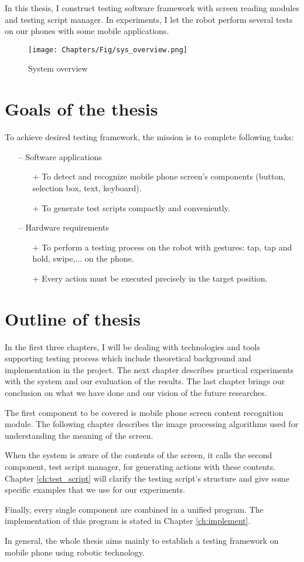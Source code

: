 In this thesis, I construct testing software framework with screen reading modules and testing script manager. In experiments, I let the robot perform several tests on our phones with some mobile applications.

	\begin{figure}
		\centering
		\texttt{[image: Chapters/Fig/sys\_overview.png]}
		\caption{System overview}
		\label{fig:sys_overview}
	\end{figure}

\section{Goals of the thesis}
To achieve desired testing framework, the mission is to complete following tasks:
	\begin{itemize}
		\item[--] Software applications
        	\begin{itemize}
				\item[+] To detect and recognize mobile phone screen's components (button, selection box, text, keyboard).
				\item[+] To generate test scripts compactly and conveniently.
			\end{itemize}
		\item[--] Hardware requirements
        	\begin{itemize}
				\item[+] To perform a testing process on the robot with gestures: tap, tap and hold, swipe,... on the phone.
				\item[+] Every action must be executed precisely in the target position.
			\end{itemize}
	\end{itemize}

\section{Outline of thesis}
In the first three chapters, I will be dealing with technologies and tools supporting testing process which include theoretical background and implementation in the project. The next chapter describes practical experiments with the system and our evaluation of the results. The last chapter brings our conclusion on what we have done and our vision of the future researches.

The first component to be covered is mobile phone screen content recognition module. The following chapter describes the image processing algorithms used for understanding the meaning of the screen. 

When the system is aware of the contents of the screen, it calls the second component, test script manager, for generating actions with these contents. Chapter \ref{ch:test_script} will clarify the testing script's structure and give some specific examples that we use for our experiments.

Finally, every single component are combined in a unified program. The implementation of this program is stated in Chapter \ref{ch:implement}.

In general, the whole thesis aims mainly to establish a testing framework on mobile phone using robotic technology. \nocite{radim_thesis}
